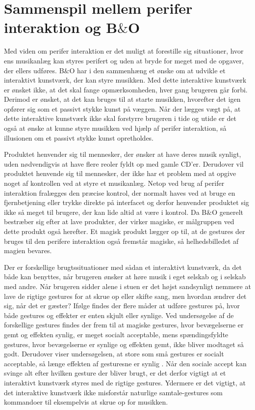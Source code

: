 \section{Sammenspil mellem perifer interaktion og B$\&$O}
\label{Sammenspil mellem perifer interaktion og BO}

Med viden om perifer interaktion er det muligt at forestille sig situationer, hvor ens musikanlæg kan styres perifert og uden at bryde for meget med de opgaver, der ellers udføres. B$\&$O har i den sammenhæng et ønske om at udvikle et interaktivt kunstværk, der kan styre musikken. Med dette interaktive kunstværk er ønsket ikke, at det skal fange opmærksomheden, hver gang brugeren går forbi. Derimod er ønsket, at det kan bruges til at starte musikken, hvorefter det igen opfører sig som et passivt stykke kunst på væggen. Når der lægges vægt på, at dette interaktive kunstværk ikke skal forstyrre brugeren i tide og utide er det også at ønske at kunne styre musikken ved hjælp af perifer interaktion, så illusionen om et passivt stykke kunst opretholdes. 

Produktet henvender sig til mennesker, der ønsker at have deres musik synligt, uden nødvendigvis at have flere reoler fyldt op med gamle CD'er. Derudover vil produktet henvende sig til mennesker, der ikke har et problem med at opgive noget af kontrollen ved at styre et musikanlæg. Netop ved brug af perifer interaktion fralægges den præcise kontrol, der normalt haves ved at bruge en fjernbetjening eller trykke direkte på interfacet og derfor henvender produktet sig ikke så meget til brugere, der kan lide altid at være i kontrol. Da B$\&$O generelt bestræber sig efter at lave produkter, der virker magiske, er målgruppen ved dette produkt også herefter. Et magisk produkt lægger op til, at de gestures der bruges til den perifere interaktion også fremstår magiske, så helhedsbilledet af magien bevares. 

Der er forskellige brugtssituationer med sådan et interaktivt kunstværk, da det både kan benyttes, når brugeren ønsker at høre musik i eget selskab og i selskab med andre. Når brugeren sidder alene i stuen er det højst sandsynligt nemmere at lave de rigtige gestures for at skrue op eller skifte sang, men hvordan ændrer det sig, når det er gæster? Ifølge \textcite[ss. 276-277]{PDF:WouldYouDoThat} findes der flere måder at udføre gestures på, hvor både gestures og effekter er enten skjult eller synlige. Ved undersøgelse af de forskellige gestures findes der frem til at magiske gestures, hvor bevægelserne er gemt og effekten synlig, er meget socialt acceptable, mens spændingsfyldte gestures, hvor bevægelserne er synlige og effekten gemt, ikke bliver modtaget så godt. Derudover viser undersøgelsen, at store som små gestures er socialt acceptable, så længe effekten af gesturesne er synlig \parencite[s. 278]{PDF:WouldYouDoThat}. Når den sociale accept kan svinge alt efter hvilken gesture der bliver brugt, er det derfor vigtigt at et interaktivt kunstværk styres med de rigtige gestures. Ydermere er det vigtigt, at det interaktive kunstværk ikke misforstår naturlige samtale-gestures som kommandoer til eksempelvis at skrue op for musikken. 

